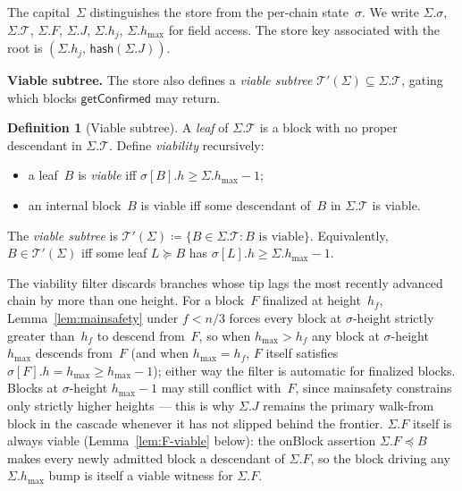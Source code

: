\ifx\litemode\undefined\documentclass{article}\fi
\newcommand{\T}[0]{\ensuremath{\mathcal{T}}}
\newcommand{\hash}{\mathsf{hash}}
\newcommand{\hmax}{\ensuremath{h_{\max}}\xspace}
\newcommand{\viableTree}{\ensuremath{\mathcal{T}'}}
\newcommand{\onBlock}{\textsf{onBlock}\xspace}
\newcommand{\getConfirmed}{\textsf{getConfirmed}\xspace}
\renewcommand{\paragraph}[1]{\vspace{7pt}\noindent\textbf{#1}}
\theoremstyle{plain}
\theoremstyle{definition}
\newtheorem{definition}{Definition}
\theoremstyle{remark}
\begin{document}
The capital~$\Sigma$ distinguishes the store from the per-chain state~$\sigma$.
We write $\Sigma.\sigma$, $\Sigma.\T$, $\Sigma.F$, $\Sigma.J$, $\Sigma.h_j$, $\Sigma.\hmax$ for field access.
The store key associated with the root is $(\Sigma.h_j,\, \hash(\Sigma.J))$.

\paragraph{Viable subtree.}
The store also defines a \emph{viable subtree} $\viableTree(\Sigma) \subseteq \Sigma.\T$, gating which blocks $\getConfirmed$ may return.

\begin{definition}[Viable subtree]\label{def:viable}
A \emph{leaf} of $\Sigma.\T$ is a block with no proper descendant in $\Sigma.\T$.
Define \emph{viability} recursively:
\begin{itemize}
  \item a leaf~$B$ is \emph{viable} iff $\sigma[B].h \geq \Sigma.\hmax - 1$;
  \item an internal block~$B$ is viable iff some descendant of~$B$ in $\Sigma.\T$ is viable.
\end{itemize}
The \emph{viable subtree} is $\viableTree(\Sigma) \coloneqq \{B \in \Sigma.\T : B \text{ is viable}\}$.
Equivalently, $B \in \viableTree(\Sigma)$ iff some leaf $L \succeq B$ has $\sigma[L].h \geq \Sigma.\hmax - 1$.
\end{definition}

The viability filter discards branches whose tip lags the most recently advanced chain by more than one height.
For a block~$F$ finalized at height~$h_f$, Lemma~\ref{lem:mainsafety} under $f < n/3$ forces every block at $\sigma$-height strictly greater than~$h_f$ to descend from~$F$, so when $\hmax > h_f$ any block at $\sigma$-height~$\hmax$ descends from~$F$ (and when $\hmax = h_f$, $F$ itself satisfies $\sigma[F].h = \hmax \geq \hmax - 1$); either way the filter is automatic for finalized blocks.
Blocks at $\sigma$-height $\hmax - 1$ may still conflict with~$F$, since mainsafety constrains only strictly higher heights --- this is why $\Sigma.J$ remains the primary walk-from block in the cascade whenever it has not slipped behind the frontier.
$\Sigma.F$ itself is always viable (Lemma~\ref{lem:F-viable} below): the \onBlock assertion $\Sigma.F \preceq B$ makes every newly admitted block a descendant of $\Sigma.F$, so the block driving any $\Sigma.\hmax$ bump is itself a viable witness for $\Sigma.F$.
\end{document}
